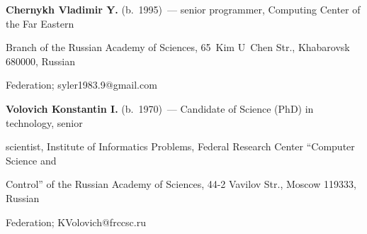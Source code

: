 \vspace*{3pt}





\noindent


\textbf{Chernykh Vladimir Y.} (b.\ 1995)~--- senior programmer, Computing Center of the Far Eastern 


Branch of the Russian Academy of Sciences, 65~Kim U~Chen Str., Khabarovsk 680000, Russian 


Federation; \mbox{syler1983.9@gmail.com}





\vspace*{3pt}





\noindent


\textbf{Volovich Konstantin I.} (b.\ 1970)~--- Candidate of Science (PhD) in technology, senior 


scientist, Institute of Informatics Problems, Federal Research Center ``Computer Science and 


Control'' of the Russian Academy of Sciences, 44-2 Vavilov Str., Moscow 119333, Russian 


Federation; \mbox{KVolovich@frccsc.ru}





\label{end\stat}





\renewcommand{\bibname}{\protect\rm Литература} 


